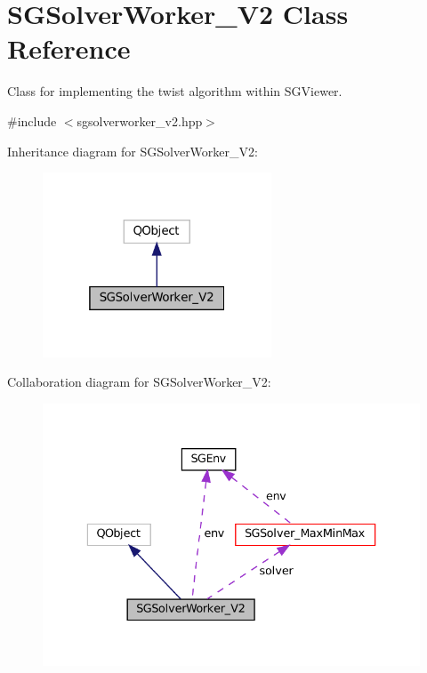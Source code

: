 \hypertarget{classSGSolverWorker__V2}{}\section{S\+G\+Solver\+Worker\+\_\+\+V2 Class Reference}
\label{classSGSolverWorker__V2}


Class for implementing the twist algorithm within S\+G\+Viewer.  




{\ttfamily \#include $<$sgsolverworker\+\_\+v2.\+hpp$>$}



Inheritance diagram for S\+G\+Solver\+Worker\+\_\+\+V2\+:
\nopagebreak
\begin{figure}[H]
\begin{center}
\leavevmode
\includegraphics[width=193pt]{classSGSolverWorker__V2__inherit__graph}
\end{center}
\end{figure}


Collaboration diagram for S\+G\+Solver\+Worker\+\_\+\+V2\+:
\nopagebreak
\begin{figure}[H]
\begin{center}
\leavevmode
\includegraphics[width=336pt]{classSGSolverWorker__V2__coll__graph}
\end{center}
\end{figure}
